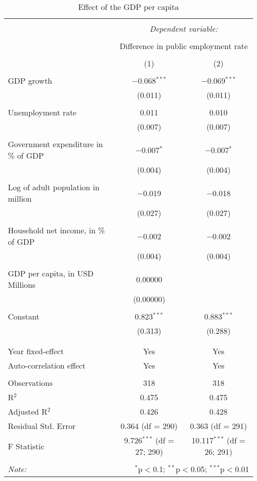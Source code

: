 
\begin{table}[!htbp] \centering 
  \caption{Effect of the GDP per capita} 
  \label{} 
\begin{tabular}{@{\extracolsep{5pt}}lcc} 
\\[-1.8ex]\hline 
\hline \\[-1.8ex] 
 & \multicolumn{2}{c}{\textit{Dependent variable:}} \\ 
\cline{2-3} 
\\[-1.8ex] & \multicolumn{2}{c}{Difference in public employment rate} \\ 
\\[-1.8ex] & (1) & (2)\\ 
\hline \\[-1.8ex] 
 GDP growth & $-$0.068$^{***}$ & $-$0.069$^{***}$ \\ 
  & (0.011) & (0.011) \\ 
  & & \\ 
 Unemployment rate & 0.011 & 0.010 \\ 
  & (0.007) & (0.007) \\ 
  & & \\ 
 Government expenditure in \% of GDP & $-$0.007$^{*}$ & $-$0.007$^{*}$ \\ 
  & (0.004) & (0.004) \\ 
  & & \\ 
 Log of adult population in million & $-$0.019 & $-$0.018 \\ 
  & (0.027) & (0.027) \\ 
  & & \\ 
 Household net income, in \% of GDP & $-$0.002 & $-$0.002 \\ 
  & (0.004) & (0.004) \\ 
  & & \\ 
 GDP per capita, in USD Millions & 0.00000 &  \\ 
  & (0.00000) &  \\ 
  & & \\ 
 Constant & 0.823$^{***}$ & 0.883$^{***}$ \\ 
  & (0.313) & (0.288) \\ 
  & & \\ 
\hline \\[-1.8ex] 
Year fixed-effect & Yes & Yes \\ 
Auto-correlation effect & Yes & Yes \\ 
\hline \\[-1.8ex] 
Observations & 318 & 318 \\ 
R$^{2}$ & 0.475 & 0.475 \\ 
Adjusted R$^{2}$ & 0.426 & 0.428 \\ 
Residual Std. Error & 0.364 (df = 290) & 0.363 (df = 291) \\ 
F Statistic & 9.726$^{***}$ (df = 27; 290) & 10.117$^{***}$ (df = 26; 291) \\ 
\hline 
\hline \\[-1.8ex] 
\textit{Note:}  & \multicolumn{2}{r}{$^{*}$p$<$0.1; $^{**}$p$<$0.05; $^{***}$p$<$0.01} \\ 
\end{tabular} 
\end{table} 
